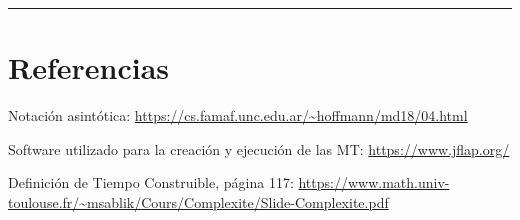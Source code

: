 \documentclass[12pt,letterpaper]{article}
\newcommand{\lineaxd}{{\color{brown}\rule{\linewidth}{0.5mm}}}
\begin{document}
\lineaxd

\section*{Referencias}
Notación asintótica: \url{https://cs.famaf.unc.edu.ar/~hoffmann/md18/04.html}

Software utilizado para la creación y ejecución de las MT: \url{https://www.jflap.org/}

Definición de Tiempo Construible, página 117:
\url{https://www.math.univ-toulouse.fr/~msablik/Cours/Complexite/Slide-Complexite.pdf}
\end{document}
